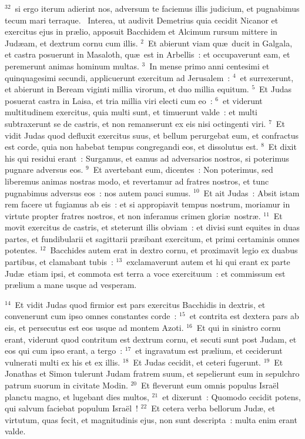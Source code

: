 ${}^{32}$~si ergo iterum adierint nos, adversum te faciemus illis judicium, et pugnabimus tecum mari terraque.
~\lettrine[lines=10,image=true,loversize=0.05,lraise=-0.03]{I}{}nterea, ut audivit Demetrius quia cecidit Nicanor et exercitus ejus in pr\ae lio, apposuit Bacchidem et Alcimum rursum mittere in Jud\ae am, et dextrum cornu cum illis.
${}^{2}$~Et abierunt viam qu\ae\ ducit in Galgala, et castra posuerunt in Masaloth, qu\ae\ est in Arbellis~: et occupaverunt eam, et peremerunt animas hominum multas.
${}^{3}$~In mense primo anni centesimi et quinquagesimi secundi, applicuerunt exercitum ad Jerusalem~:
${}^{4}$~et surrexerunt, et abierunt in Beream viginti millia virorum, et duo millia equitum.
${}^{5}$~Et Judas posuerat castra in Laisa, et tria millia viri electi cum eo~:
${}^{6}$~et viderunt multitudinem exercitus, quia multi sunt, et timuerunt valde~: et multi subtraxerunt se de castris, et non remanserunt ex eis nisi octingenti viri.
${}^{7}$~Et vidit Judas quod defluxit exercitus suus, et bellum perurgebat eum, et confractus est corde, quia non habebat tempus congregandi eos, et dissolutus est.
${}^{8}$~Et dixit his qui residui erant~: Surgamus, et eamus ad adversarios nostros, si poterimus pugnare adversus eos.
${}^{9}$~Et avertebant eum, dicentes~: Non poterimus, sed liberemus animas nostras modo, et revertamur ad fratres nostros, et tunc pugnabimus adversus eos~: nos autem pauci sumus.
${}^{10}$~Et ait Judas~: Absit istam rem facere ut fugiamus ab eis~: et si appropiavit tempus nostrum, moriamur in virtute propter fratres nostros, et non inferamus crimen glori\ae\ nostr\ae .
${}^{11}$~Et movit exercitus de castris, et steterunt illis obviam~: et divisi sunt equites in duas partes, et fundibularii et sagittarii pr\ae ibant exercitum, et primi certaminis omnes potentes.
${}^{12}$~Bacchides autem erat in dextro cornu, et proximavit legio ex duabus partibus, et clamabant tubis~:
${}^{13}$~exclamaverunt autem et hi qui erant ex parte Jud\ae\ etiam ipsi, et commota est terra a voce exercituum~: et commissum est pr\ae lium a mane usque ad vesperam.


${}^{14}$~Et vidit Judas quod firmior est pars exercitus Bacchidis in dextris, et convenerunt cum ipso omnes constantes corde~:
${}^{15}$~et contrita est dextera pars ab eis, et persecutus est eos usque ad montem Azoti.
${}^{16}$~Et qui in sinistro cornu erant, viderunt quod contritum est dextrum cornu, et secuti sunt post Judam, et eos qui cum ipso erant, a tergo~:
${}^{17}$~et ingravatum est pr\ae lium, et ceciderunt vulnerati multi ex his et ex illis.
${}^{18}$~Et Judas cecidit, et ceteri fugerunt.
${}^{19}$~Et Jonathas et Simon tulerunt Judam fratrem suum, et sepelierunt eum in sepulchro patrum suorum in civitate Modin.
${}^{20}$~Et fleverunt eum omnis populus Isra\"el planctu magno, et lugebant dies multos,
${}^{21}$~et dixerunt~: Quomodo cecidit potens, qui salvum faciebat populum Isra\"el~!
${}^{22}$~Et cetera verba bellorum Jud\ae , et virtutum, quas fecit, et magnitudinis ejus, non sunt descripta~: multa enim erant valde.


